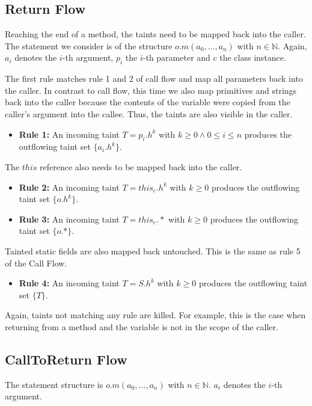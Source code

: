 \documentclass[../draft.tex]{subfiles}
\begin{document}
    \subsection{Return Flow}
    Reaching the end of a method, the taints need to be mapped back into the caller. The statement we consider is of the structure $o.m(a_0, ..., a_n)$ with $n \in \mathbb{N}$. Again, $a_i$ denotes the $i$-th argument, $p_i$ the $i$-th parameter and $c$ the class instance.

    The first rule matches rule 1 and 2 of call flow and map all parameters back into the caller. In contrast to call flow, this time we also map primitives and strings back into the caller because the contents of the variable were copied from the caller's argument into the callee. Thus, the taints are also visible in the caller.
    \begin{itemize}
        \item[] \textbf{Rule 1:} An incoming taint $T = p_i.h^k$ with $k \geq 0 \land 0 \leq i \leq n$ produces the outflowing taint set $\{a_i.h^k\}$.
    \end{itemize}

    The $\mathit{this}$ reference also needs to be mapped back into the caller.
    \begin{itemize}
        \item[] \textbf{Rule 2:} An incoming taint $T = \mathit{this}_c.h^k$ with $k \geq 0$ produces the outflowing taint set $\{o.h^k\}$. 
        \item[] \textbf{Rule 3:} An incoming taint $T = \mathit{this}_c.*$ with $k \geq 0$ produces the outflowing taint set $\{o.*\}$.
    \end{itemize}
    
    Tainted static fields are also mapped back untouched. This is the same as rule 5 of the Call Flow.
    \begin{itemize}
        \item[] \textbf{Rule 4:} An incoming taint $T = S.h^k$ with $k \geq 0$ produces the outflowing taint set $\{T\}$. 
    \end{itemize}
    
    Again, taints not matching any rule are killed. For example, this is the case when returning from a method and the variable is not in the scope of the caller.

    \subsection{CallToReturn Flow}
    The statement structure is $o.m(a_0, ..., a_n)$ with $n \in \mathbb{N}$. $a_i$ denotes the $i$-th argument.
\end{document}
